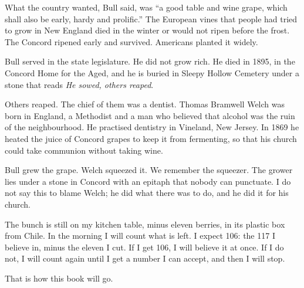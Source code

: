 What the country wanted, Bull said, was ``a good table and wine grape, which
shall also be early, hardy and prolific.''%
The European vines that people had tried to grow in New England died in the
winter or would not ripen before the frost. The Concord ripened early and
survived. Americans planted it widely.


Bull served in the state legislature. He did not grow rich.%
He died in 1895, in the Concord Home for the Aged, and he is buried in
Sleepy Hollow Cemetery under a stone that reads \emph{He sowed, others
reaped}.%

Others reaped. The chief of them was a dentist. Thomas Bramwell Welch was
born in England, a Methodist and a man who believed that alcohol was the
ruin of the neighbourhood. He practised dentistry in Vineland, New Jersey.
In 1869 he heated the juice of Concord grapes to keep it from fermenting,
so that his church could take communion without taking wine.%

Bull grew the grape. Welch squeezed it. We remember the squeezer. The
grower lies under a stone in Concord with an epitaph that nobody can
punctuate. I do not say this to blame Welch; he did what there was to do,
and he did it for his church.

\bigskip

The bunch is still on my kitchen table, minus eleven berries, in its plastic
box from Chile. In the morning I will count what is left. I expect 106: the
117 I believe in, minus the eleven I cut. If I get 106, I will believe it at
once. If I do not, I will count again until I get a number I can accept, and
then I will stop.

That is how this book will go.
